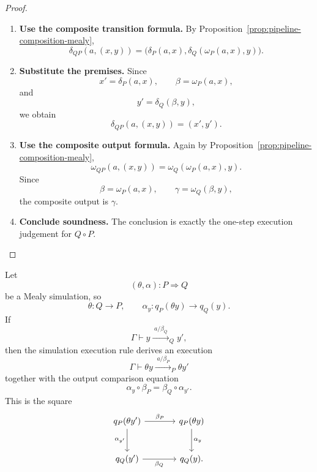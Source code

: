 \begin{proof}
    \leavevmode
    \begin{enumerate}
        \item \textbf{Use the composite transition formula.}
        By Proposition~\ref{prop:pipeline-composition-mealy},
        \[
            \delta_{QP}(a,(x,y))
            =
            \bigl(
            \delta_P(a,x),
            \delta_Q(\omega_P(a,x),y)
            \bigr).
        \]

        \item \textbf{Substitute the premises.}
        Since
        \[
            x'=\delta_P(a,x),
            \qquad
            \beta=\omega_P(a,x),
        \]
        and
        \[
            y'=\delta_Q(\beta,y),
        \]
        we obtain
        \[
            \delta_{QP}(a,(x,y))=(x',y').
        \]

        \item \textbf{Use the composite output formula.}
        Again by Proposition~\ref{prop:pipeline-composition-mealy},
        \[
            \omega_{QP}(a,(x,y))
            =
            \omega_Q(\omega_P(a,x),y).
        \]
        Since
        \[
            \beta=\omega_P(a,x),
            \qquad
            \gamma=\omega_Q(\beta,y),
        \]
        the composite output is \(\gamma\).

        \item \textbf{Conclude soundness.}
        The conclusion is exactly the one-step execution judgement for
        \(Q\circ P\).
    \end{enumerate}
\end{proof}

\begin{definition}
\label{def:simulation-execution-rule}
    Let
    \[
        (\theta,\alpha):P\Rightarrow Q
    \]
    be a Mealy simulation, so
    \[
        \theta:Q\to P,
        \qquad
        \alpha_y:q_P(\theta y)\to q_Q(y).
    \]
    If
    \[
        \Gamma\vdash
        y\xrightarrow{\;a/\beta_Q\;}_{Q}y',
    \]
    then the simulation execution rule derives an execution
    \[
        \Gamma\vdash
        \theta y\xrightarrow{\;a/\beta_P\;}_{P}\theta y'
    \]
    together with the output comparison equation
    \[
        \alpha_y\circ \beta_P
        =
        \beta_Q\circ\alpha_{y'}.
    \]
    This is the square
    \[
        \begin{tikzcd}[column sep=large, row sep=large]
            q_P(\theta y')
                \arrow[r, "\beta_P"]
                \arrow[d, "\alpha_{y'}"']
            &
            q_P(\theta y)
                \arrow[d, "\alpha_y"]
            \\
            q_Q(y')
                \arrow[r, "\beta_Q"']
            &
            q_Q(y).
        \end{tikzcd}
    \]
\end{definition}

